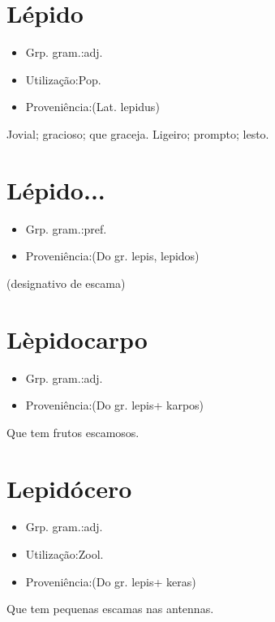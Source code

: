 \section{Lépido}
\begin{itemize}
\item {Grp. gram.:adj.}
\end{itemize}
\begin{itemize}
\item {Utilização:Pop.}
\end{itemize}
\begin{itemize}
\item {Proveniência:(Lat. \textunderscore lepidus\textunderscore )}
\end{itemize}
Jovial; gracioso; que graceja.
Ligeiro; prompto; lesto.
\section{Lépido...}
\begin{itemize}
\item {Grp. gram.:pref.}
\end{itemize}
\begin{itemize}
\item {Proveniência:(Do gr. \textunderscore lepis\textunderscore , \textunderscore lepidos\textunderscore )}
\end{itemize}
(designativo de \textunderscore escama\textunderscore )
\section{Lèpidocarpo}
\begin{itemize}
\item {Grp. gram.:adj.}
\end{itemize}
\begin{itemize}
\item {Proveniência:(Do gr. \textunderscore lepis\textunderscore  + \textunderscore karpos\textunderscore )}
\end{itemize}
Que tem frutos escamosos.
\section{Lepidócero}
\begin{itemize}
\item {Grp. gram.:adj.}
\end{itemize}
\begin{itemize}
\item {Utilização:Zool.}
\end{itemize}
\begin{itemize}
\item {Proveniência:(Do gr. \textunderscore lepis\textunderscore  + \textunderscore keras\textunderscore )}
\end{itemize}
Que tem pequenas escamas nas antennas.
